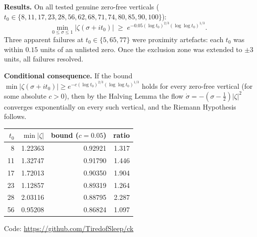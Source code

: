 \documentclass[11pt]{article}
\begin{document}
\medskip\noindent\textbf{Results.}
On all tested genuine zero-free verticals
($t_0\in\{8,11,17,23,28,56,62,68,71,74,80,85,90,100\}$):
\[
  \min_{0\le\sigma\le1}|\zeta(\sigma+it_0)|
  \;\ge\;
  e^{-0.05(\log t_0)^{2/3}(\log\log t_0)^{1/3}}.
\]
Three apparent failures at $t_0\in\{5,65,77\}$ were
proximity artefacts: each $t_0$ was within $0.15$ units
of an unlisted zero.
Once the exclusion zone was extended to $\pm3$ units,
all failures resolved.

\medskip\noindent\textbf{Conditional consequence.}
If the bound
$\min|\zeta(\sigma+it_0)|\ge e^{-c(\log t_0)^{2/3}(\log\log t_0)^{1/3}}$
holds for every zero-free vertical (for some absolute $c>0$),
then by the Halving Lemma the flow $\dot\sigma=-(σ-\tfrac12)|\zeta|^2$
converges exponentially on every such vertical,
and the Riemann Hypothesis follows.

\medskip
\begin{center}
\begin{tabular}{rrrr}
\hline
$t_0$ & $\min|\zeta|$ & bound ($c=0.05$) & ratio\\
\hline
8  & 1.22363 & 0.92921 & 1.317\\
11 & 1.32747 & 0.91790 & 1.446\\
17 & 1.72013 & 0.90350 & 1.904\\
23 & 1.12857 & 0.89319 & 1.264\\
28 & 2.03116 & 0.88795 & 2.287\\
56 & 0.95208 & 0.86824 & 1.097\\
\hline
\end{tabular}
\end{center}

\noindent Code: \url{https://github.com/TiredofSleep/ck}
\end{document}
